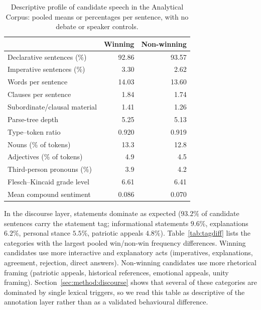 \documentclass[pdflatex,sn-mathphys-num]{sn-jnl}%
\begin{document}
\begin{table}[t]
\caption{Descriptive profile of candidate speech in the Analytical Corpus:
pooled means or percentages per sentence, with no debate or speaker
controls.}
\label{tab:descprofile}
\centering
\footnotesize
\begin{tabular}{lrr}
\toprule
 & Winning & Non-winning \\
\midrule
Declarative sentences (\%)   & 92.86 & 93.57 \\
Imperative sentences (\%)    & 3.30  & 2.62  \\
\midrule
Words per sentence           & 14.03 & 13.60 \\
Clauses per sentence         & 1.84  & 1.74  \\
Subordinate/clausal material & 1.41  & 1.26  \\
Parse-tree depth             & 5.25  & 5.13  \\
\midrule
Type--token ratio            & 0.920 & 0.919 \\
Nouns (\% of tokens)         & 13.3  & 12.8  \\
Adjectives (\% of tokens)    & 4.9   & 4.5   \\
Third-person pronouns (\%)   & 3.9   & 4.2   \\
Flesch--Kincaid grade level  & 6.61  & 6.41  \\
Mean compound sentiment      & 0.086 & 0.070 \\
\bottomrule
\end{tabular}
\end{table}

In the discourse layer, statements dominate as expected ($93.2\%$ of
candidate sentences carry the statement tag; informational statements
$9.6\%$, explanations $6.2\%$, personal stance $5.5\%$, patriotic appeals
$4.8\%$). Table~\ref{tab:tagdiff} lists the categories with the largest
pooled win/non-win frequency differences. Winning candidates use more
interactive and explanatory acts (imperatives, explanations, agreement,
rejection, direct answers). Non-winning candidates use more
rhetorical framing (patriotic appeals, historical references, emotional
appeals, unity framing). Section~\ref{sec:method:discourse} shows that
several of these categories are dominated by single lexical triggers, so we
read this table as descriptive of the annotation layer rather than as a
validated behavioural difference.
\end{document}
